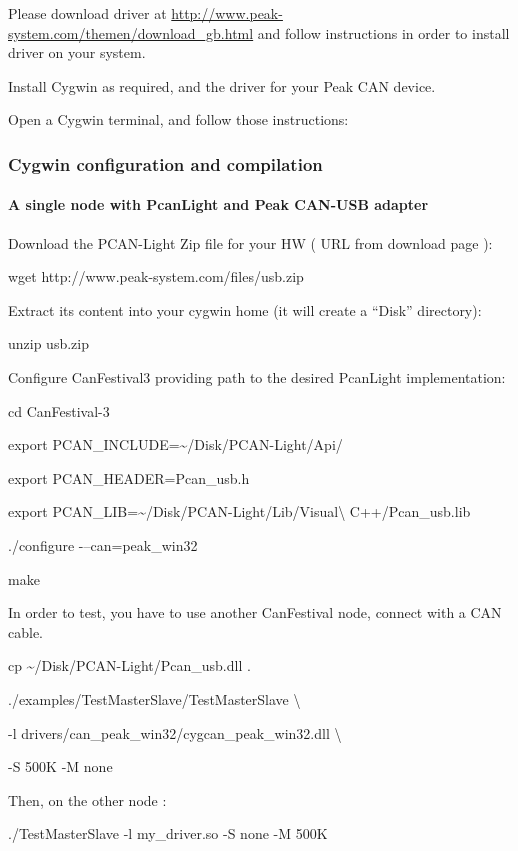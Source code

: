 \documentclass[a4paper,12pt]{book}
\begin{document}
Please download driver at
\href{http://www.peak-system.com/themen/download_gb.html}{http://www.peak{}-system.com/themen/download\_gb.html}
\space and follow instructions in order to install driver on your system.

Install Cygwin as required, and the driver for your Peak CAN device.

Open a Cygwin terminal, and follow those instructions:

\subsubsection{Cygwin configuration and compilation}
\paragraph{A single node with PcanLight and Peak CAN{}-USB adapter}
Download the PCAN{}-Light Zip file for your HW ( URL from download page
): 

{\ttfamily
wget http://www.peak{}-system.com/files/usb.zip}

Extract its content into your cygwin home (it will create a ``Disk''
directory):

{\ttfamily
unzip usb.zip}

Configure CanFestival3 providing path to the desired PcanLight
implementation:

{\ttfamily
cd CanFestival{}-3}

{\ttfamily
export PCAN\_INCLUDE=\~{}/Disk/PCAN{}-Light/Api/}

{\ttfamily
export PCAN\_HEADER=Pcan\_usb.h}

{\ttfamily
export PCAN\_LIB=\~{}/Disk/PCAN{}-Light/Lib/Visual{\textbackslash}
C++/Pcan\_usb.lib}

{\ttfamily
./configure {}-{--}can=peak\_win32}

{\ttfamily
make}

In order to test, you have to use another CanFestival node, connect with
a CAN cable.

{\ttfamily
cp \~{}/Disk/PCAN{}-Light/Pcan\_usb.dll .}

{\ttfamily
./examples/TestMasterSlave/TestMasterSlave {\textbackslash}}

{\ttfamily
  {}-l drivers/can\_peak\_win32/cygcan\_peak\_win32.dll
{\textbackslash}}

{\ttfamily
  {}-S 500K {}-M none}

Then, on the other node :

{\ttfamily
./TestMasterSlave {}-l my\_driver.so {}-S none {}-M 500K}
\end{document}
